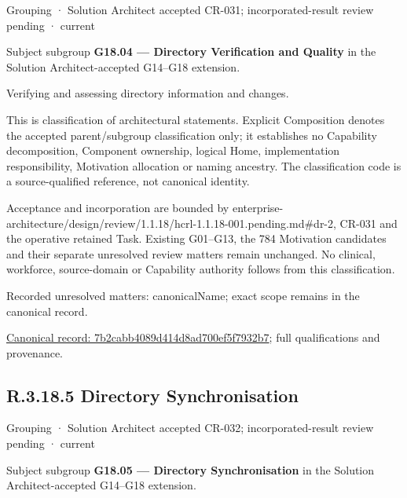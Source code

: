 \label{element:7b2cabb4089d414d8ad700ef5f7932b7}
{\small Grouping · Solution Architect accepted CR-031; incorporated-result review pending · current}\par

Subject subgroup \textbf{G18.04 — Directory Verification and Quality} in the Solution Architect-accepted G14–G18 extension.



Verifying and assessing directory information and changes.



This is classification of architectural statements. Explicit Composition denotes the accepted parent/subgroup classification only; it establishes no Capability decomposition, Component ownership, logical Home, implementation responsibility, Motivation allocation or naming ancestry. The classification code is a source-qualified reference, not canonical identity.



Acceptance and incorporation are bounded by enterprise-architecture/design/review/1.1.18/hcrl-1.1.18-001.pending.md\#dr-2, CR-031 and the operative retained Task. Existing G01–G13, the 784 Motivation candidates and their separate unresolved review matters remain unchanged. No clinical, workforce, source-domain or Capability authority follows from this classification.


{\small Recorded unresolved matters: canonicalName; exact scope remains in the canonical record.}\par
{\footnotesize \href{../../../../continuum/grouping/7b2cabb4089d414d8ad700ef5f7932b7.md}{Canonical record: 7b2cabb4089d414d8ad700ef5f7932b7}; full qualifications and provenance.}\par
\subsection*{R.3.18.5 Directory Synchronisation}
\label{navigation:R.3.18.5}

\label{element:e1ed88f315a84116a77ead21d8fe1792}
{\small Grouping · Solution Architect accepted CR-032; incorporated-result review pending · current}\par

Subject subgroup \textbf{G18.05 — Directory Synchronisation} in the Solution Architect-accepted G14–G18 extension.



